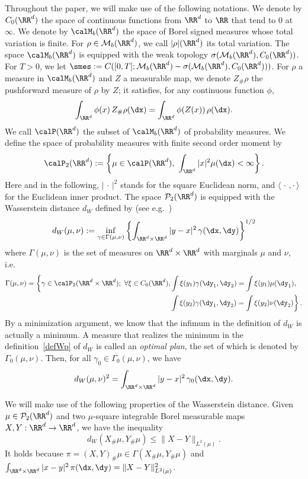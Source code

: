 Throughout the paper, we will make use of the following notations. We denote by $C_0(\RR^d)$ the space of continuous functions from $\RR^d$ to $\RR$ that tend to $0$ at $\infty$. We denote by $\calM_b(\RR^d)$ the space of Borel signed measures whose total variation is finite. For $\rho\in \mathcal{M}_{b}(\RR^d)$, we call $|\rho|(\RR^d)$ its total variation. The space $\calM_b(\RR^d)$ is equipped with the weak topology $\sigma(\mathcal{M}_b(\RR^d),C_0(\RR^d))$. For $T>0$, we let $\smes :=C([0,T];\mathcal{M}_b(\RR^d)-\sigma(\mathcal{M}_b(\RR^d),C_0(\RR^d)))$. For $\rho$ a measure in $\calM_b(\RR^d)$ and $Z$ a measurable map, we denote $Z_\#\rho$ the pushforward measure of $\rho$ by $Z$; it satisfies, for any continuous function $\phi$,
\[
\int_{\RR^d} \phi(x)\, Z_\#\rho(\dx) = \int_{\RR^d} \phi(Z(x))\,\rho(\dx).
\]
We call $\calP(\RR^d)$ the subset of $\calM_b(\RR^d)$ of probability measures. We define the space of probability measures with finite second order moment by
\[
\calP_2(\RR^d) := \left\{\mu \in \calP(\RR^d),\ \int_{\RR^d} |x|^2 \mu(\dx) <\infty\right\}.
\]
Here and in the following, $|{\,\cdot\,}|^2$ stands for the square Euclidean norm, and $\langle{\,\cdot\,,\cdot\,}\rangle$ for the Euclidean inner product. The space ${\mathcal P}_{2}(\RR^d)$ is equipped with the Wasserstein distance $d_W$ defined by (see e.g.~\cite{Ambrosio,Villani2, Villani1, Filippoctouo})
\begin{equation}\label{defWp}
d_W(\mu,\nu) := \inf_{\gamma\in \Gamma(\mu,\nu)} \left\{\int_{\RR^d\times \RR^d} |y-x|^2\,\gamma(\dx,\dy)\right\}^{1/2}
\end{equation}
where $\Gamma(\mu,\nu)$ is the set of measures on $\RR^d\times\RR^d$ with marginals $\mu$ and $\nu$, i.e.
\begin{align*}
\Gamma(\mu,\nu) = \left\{ \gamma\in \calP_2(\RR^d\times\RR^d);\ \forall \xi\in C_0(\RR^d), 
\int \xi(y_1)\gamma(\dy_1,\dy_2) = \int \xi(y_1) \mu(\dy_1),\right. \;\; \\
\left.\int \xi(y_2)\gamma(\dy_1,\dy_2) = \int \xi(y_2) \nu(\dy_2) \right\}.
\end{align*}
By a minimization argument, we know that the infimum in the definition of $d_{W}$ is actually a minimum. A measure that realizes the minimum in the definition~\eqref{defWp} of $d_W$ is called an \emph{optimal plan}, the set of which is denoted by $\Gamma_0(\mu,\nu)$. Then, for all $\gamma_0\in \Gamma_0(\mu,\nu)$, we have
\[
d_W(\mu,\nu)^2= \int_{\RR^d\times \RR^d} |y-x|^2\,\gamma_0(\dx,\dy).
\]

We will make use of the following properties of the Wasserstein distance. Given $\mu \in {\mathcal P}_{2}(\RR^d)$ and two $\mu$-square integrable Borel measurable maps $X,Y:\RR^d\to \RR^d$, we have the inequality
\begin{equation*}
d_W(X_\#\mu,Y_\#\mu) \leq \|X-Y\|_{L^2(\mu)}.
\end{equation*}
It holds because $\pi=(X,Y)_\# \mu\in \Gamma(X_\#\mu,Y_\#\mu)$ and $\int_{\RR^d\times \RR^d} |x-y|^2\,\pi(\dx,\dy)=\|X-Y\|_{L^2(\mu)}^2$.

